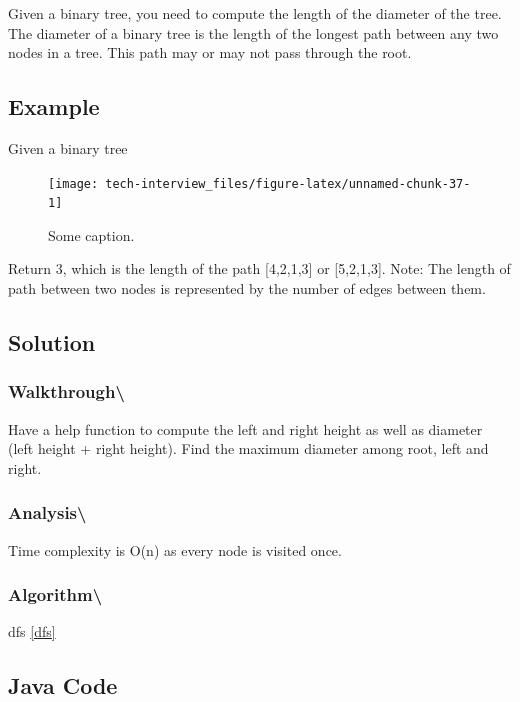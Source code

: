\documentclass[]{book}
\begin{document}
Given a binary tree, you need to compute the length of the diameter of the tree. The diameter of a binary tree is the
length of the longest path between any two nodes in a tree. This path may or may not pass through the root.

\hypertarget{example-70}{%
\subsection{Example}\label{example-70}}

Given a binary tree

\begin{figure}
\texttt{[image: tech-interview\_files/figure-latex/unnamed-chunk-37-1]} \caption{Some caption.}\label{fig:unnamed-chunk-37}
\end{figure}

Return 3, which is the length of the path {[}4,2,1,3{]} or {[}5,2,1,3{]}.
Note: The length of path between two nodes is represented by the number of edges between them.

\hypertarget{solution-50}{%
\subsection{Solution}\label{solution-50}}

\hypertarget{walkthrough-84}{%
\subsubsection{Walkthrough\textbackslash{}}\label{walkthrough-84}}

Have a help function to compute the left and right height as well as diameter (left height + right height). Find the
maximum diameter among root, left and right.

\hypertarget{analysis-91}{%
\subsubsection{Analysis\textbackslash{}}\label{analysis-91}}

Time complexity is O(n) as every node is visited once.

\hypertarget{algorithm-92}{%
\subsubsection{Algorithm\textbackslash{}}\label{algorithm-92}}

dfs \ref{dfs}

\hypertarget{java-code-54}{%
\subsection{Java Code}\label{java-code-54}}
\end{document}
